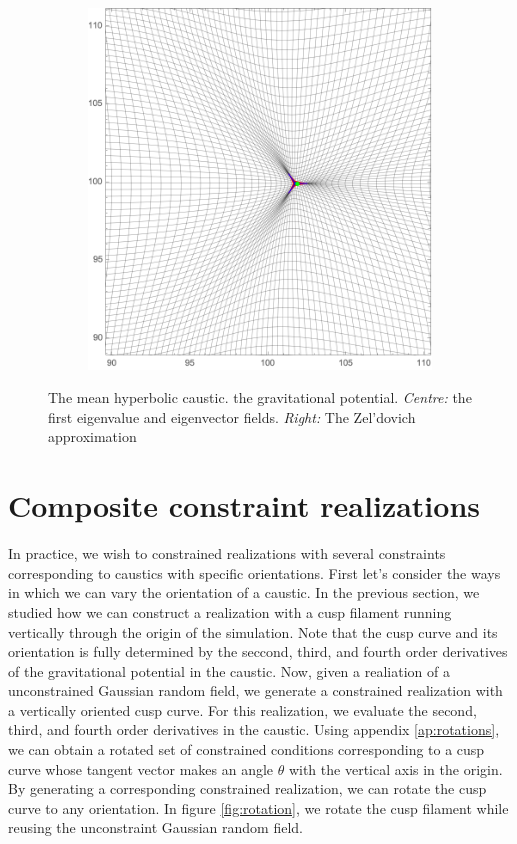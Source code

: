 \documentclass[a4paper, 11pt]{article}
\begin{document}
\begin{figure}
\begin{subfigure}[b]{0.32\textwidth}
\end{subfigure}~
\begin{subfigure}[b]{0.32\textwidth}
\includegraphics[width=\textwidth]{Hyperbolic_mean_Z}
\end{subfigure}
\caption{The mean hyperbolic caustic.  the gravitational potential. \textit{Centre:} the first eigenvalue and eigenvector fields. \textit{Right:} The Zel'dovich approximation}\label{fig:meanHyperbolic}
\end{figure}


\section{Composite constraint realizations}
In practice, we wish to constrained realizations with several constraints corresponding to caustics with specific orientations. First let's consider the ways in which we can vary the orientation of a caustic. In the previous section, we studied how we can construct a realization with a cusp filament running vertically through the origin of the simulation. Note that the cusp curve and its orientation is fully determined by the seccond, third, and fourth order derivatives of the gravitational potential in the caustic. Now, given a realiation of a unconstrained Gaussian random field, we generate a constrained realization with a vertically oriented cusp curve. For this realization, we evaluate the second, third, and fourth order derivatives in the caustic. Using appendix \ref{ap:rotations}, we can obtain a rotated set of constrained conditions corresponding to a cusp curve whose tangent vector makes an angle $\theta$ with the vertical axis in the origin. By generating a corresponding constrained realization, we can rotate the cusp curve to any orientation. In figure \ref{fig:rotation}, we rotate the cusp filament while reusing the unconstraint Gaussian random field.
\end{document}
